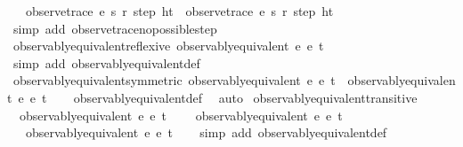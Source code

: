 \begin{isabellebody}
\ \ \ observe{\isacharunderscore}trace\ e{}\ s{}\ r{}\ step\ {\isacharparenleft}h{\isacharhash}t{\isacharparenright}\ {\isacharequal}\ observe{\isacharunderscore}trace\ e{}\ s{}\ r{}\ step\ {\isacharparenleft}h{\isacharhash}t{\isacharparenright}{\isachardoublequoteclose}\isanewline
%
\isadelimproof
\ \ %
\endisadelimproof
%
\isatagproof
{}\isamarkupfalse%
\ {\isacharparenleft}simp\ add{\isacharcolon}\ observe{\isacharunderscore}trace{\isacharunderscore}no{\isacharunderscore}possible{\isacharunderscore}step{\isacharparenright}%
\endisatagproof
{\isafoldproof}%
%
\isadelimproof
\isanewline
%
\endisadelimproof
\isanewline
{}\isamarkupfalse%
\ observably{\isacharunderscore}equivalent{\isacharunderscore}reflexive{\isacharcolon}\ {\isachardoublequoteopen}observably{\isacharunderscore}equivalent\ e{}\ e{}\ t{\isachardoublequoteclose}\isanewline
%
\isadelimproof
\ \ %
\endisadelimproof
%
\isatagproof
{}\isamarkupfalse%
\ {\isacharparenleft}simp\ add{\isacharcolon}\ observably{\isacharunderscore}equivalent{\isacharunderscore}def{\isacharparenright}%
\endisatagproof
{\isafoldproof}%
%
\isadelimproof
\isanewline
%
\endisadelimproof
\isanewline
{}\isamarkupfalse%
\ observably{\isacharunderscore}equivalent{\isacharunderscore}symmetric{\isacharcolon}\ {\isachardoublequoteopen}observably{\isacharunderscore}equivalent\ e{}\ e{}\ t\ {\isacharequal}\ observably{\isacharunderscore}equivalent\ e{}\ e{}\ t{\isachardoublequoteclose}\isanewline
%
\isadelimproof
\ \ %
\endisadelimproof
%
\isatagproof
{}\isamarkupfalse%
\ observably{\isacharunderscore}equivalent{\isacharunderscore}def\ \isamarkupfalse%
\ auto%
\endisatagproof
{\isafoldproof}%
%
\isadelimproof
\isanewline
%
\endisadelimproof
\isanewline
{}\isamarkupfalse%
\ observably{\isacharunderscore}equivalent{\isacharunderscore}transitive{\isacharcolon}\isanewline
\ \ {\isachardoublequoteopen}observably{\isacharunderscore}equivalent\ e{}\ e{}\ t\ {\isasymLongrightarrow}\isanewline
\ \ \ observably{\isacharunderscore}equivalent\ e{}\ e{}\ t\ {\isasymLongrightarrow}\isanewline
\ \ \ observably{\isacharunderscore}equivalent\ e{}\ e{}\ t{\isachardoublequoteclose}\isanewline
%
\isadelimproof
\ \ %
\endisadelimproof
%
\isatagproof
{}\isamarkupfalse%
\ {\isacharparenleft}simp\ add{\isacharcolon}\ observably{\isacharunderscore}equivalent{\isacharunderscore}def{\isacharparenright}%

\end{isabellebody}
